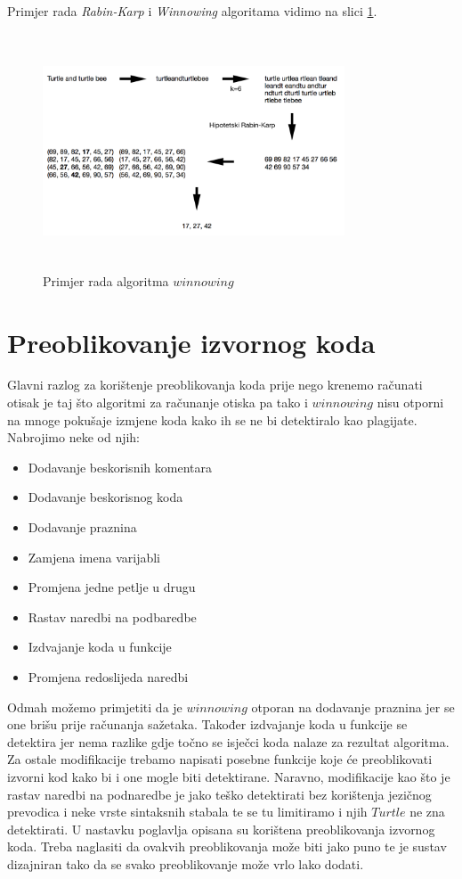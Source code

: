 \noindent Primjer rada \textit{Rabin-Karp} i \textit{Winnowing} algoritama vidimo na slici \ref{fig:winnowing}.

\begin{figure}[htb]
	\centering
	\includegraphics[width=0.8\textwidth, height=7cm, keepaspectratio]{fig/winnowing.png}
	\caption{Primjer rada algoritma $winnowing$}
	\label{fig:winnowing}
\end{figure}


\section{Preoblikovanje izvornog koda}

Glavni razlog za korištenje preoblikovanja koda prije nego krenemo računati otisak je taj što algoritmi za računanje otiska pa tako i $winnowing$ nisu otporni na mnoge pokušaje izmjene koda kako ih se ne bi detektiralo kao plagijate. Nabrojimo neke od njih:

	\begin{itemize}
		\item Dodavanje beskorisnih komentara
		\item Dodavanje beskorisnog koda
		\item Dodavanje praznina
		\item Zamjena imena varijabli
		\item Promjena jedne petlje u drugu
		\item Rastav naredbi na podbaredbe
		\item Izdvajanje koda u funkcije
		\item Promjena redoslijeda naredbi
	\end{itemize}
	
\noindent Odmah možemo primjetiti da je $winnowing$ otporan na dodavanje praznina jer se one brišu prije računanja sažetaka. Također izdvajanje koda u funkcije se detektira jer nema razlike gdje točno se isječci koda nalaze za rezultat algoritma. Za ostale modifikacije trebamo napisati posebne funkcije koje će preoblikovati izvorni kod kako bi i one mogle biti detektirane. Naravno, modifikacije kao što je rastav naredbi na podnaredbe  je jako teško detektirati bez korištenja jezičnog prevodica i neke vrste sintaksnih stabala te se tu limitiramo i njih $Turtle$ ne zna detektirati. U nastavku poglavlja opisana su korištena preoblikovanja izvornog koda. Treba naglasiti da ovakvih preoblikovanja može biti jako puno te je sustav dizajniran tako da se svako preoblikovanje može vrlo lako dodati.


